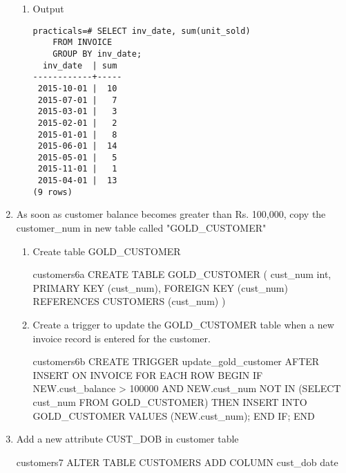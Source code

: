 \begin{enumerate}
\begin{enumerate}
		      \item Output

		            \begin{lstlisting}[style=output]
practicals=# SELECT inv_date, sum(unit_sold)
    FROM INVOICE
    GROUP BY inv_date;
  inv_date  | sum 
------------+-----
 2015-10-01 |  10
 2015-07-01 |   7
 2015-03-01 |   3
 2015-02-01 |   2
 2015-01-01 |   8
 2015-06-01 |  14
 2015-05-01 |   5
 2015-11-01 |   1
 2015-04-01 |  13
(9 rows)
                \end{lstlisting}


	      \end{enumerate}

	\item As soon as customer balance becomes greater than Rs. 100,000, copy the customer\_num in new table
	      called "GOLD\_CUSTOMER"

	      \begin{enumerate}
		      \item Create table GOLD\_CUSTOMER

		            \begin{sqlQuery}{customers6a}
                        CREATE TABLE GOLD_CUSTOMER
                        (
                            cust_num int,
                            PRIMARY KEY (cust_num),
                            FOREIGN KEY (cust_num) REFERENCES CUSTOMERS (cust_num)
                        )
                    \end{sqlQuery}
		            \pagebreak

		      \item Create a trigger to update the GOLD\_CUSTOMER table when a new invoice record is entered for the customer.

		            \begin{sqlQuery}{customers6b}
                        CREATE TRIGGER update_gold_customer
                        AFTER INSERT ON INVOICE
                        FOR EACH ROW
                        BEGIN
                            IF NEW.cust_balance > 100000 
                            AND NEW.cust_num NOT IN (SELECT cust_num FROM GOLD_CUSTOMER) THEN
                                INSERT INTO GOLD_CUSTOMER VALUES (NEW.cust_num);
                            END IF;
                        END                        
                    \end{sqlQuery}

	      \end{enumerate}

	\item Add a new attribute CUST\_DOB in customer table

	      \begin{sqlQuery}{customers7}
            ALTER TABLE CUSTOMERS
            ADD COLUMN cust_dob date
          \end{sqlQuery}

\end{enumerate}
